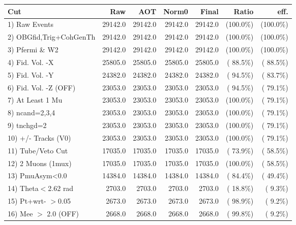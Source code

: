  \begin{table}[h!]\centering
 \begin{tabular}{||l||r|r|r|r|r|r||}
 \hline
 \hline
 Cut & Raw & AOT & Norm0 & Final & Ratio & eff.       \\
 \hline
  1) Raw Events           &      29142.0 &      29142.0 &      29142.0 &      29142.0 & (100.0\%) & (100.0\%) \\
  2) OBGfid,Trig+CohGenTh &      29142.0 &      29142.0 &      29142.0 &      29142.0 & (100.0\%) & (100.0\%) \\
  3) Pfermi \& W2         &      29142.0 &      29142.0 &      29142.0 &      29142.0 & (100.0\%) & (100.0\%) \\
  4) Fid. Vol. -X         &      25805.0 &      25805.0 &      25805.0 &      25805.0 & ( 88.5\%) & ( 88.5\%) \\
  5) Fid. Vol. -Y         &      24382.0 &      24382.0 &      24382.0 &      24382.0 & ( 94.5\%) & ( 83.7\%) \\
  6) Fid. Vol. -Z (OFF)   &      23053.0 &      23053.0 &      23053.0 &      23053.0 & ( 94.5\%) & ( 79.1\%) \\
  7) At Least 1 Mu        &      23053.0 &      23053.0 &      23053.0 &      23053.0 & (100.0\%) & ( 79.1\%) \\
  8) ncand=2,3,4          &      23053.0 &      23053.0 &      23053.0 &      23053.0 & (100.0\%) & ( 79.1\%) \\
  9) tnchgd=2             &      23053.0 &      23053.0 &      23053.0 &      23053.0 & (100.0\%) & ( 79.1\%) \\
 10) +/- Tracks (V0)      &      23053.0 &      23053.0 &      23053.0 &      23053.0 & (100.0\%) & ( 79.1\%) \\
 11) Tube/Veto Cut        &      17035.0 &      17035.0 &      17035.0 &      17035.0 & ( 73.9\%) & ( 58.5\%) \\
 12) 2 Muons (1mux)       &      17035.0 &      17035.0 &      17035.0 &      17035.0 & (100.0\%) & ( 58.5\%) \\
 13) PmuAsym<0.0          &      14384.0 &      14384.0 &      14384.0 &      14384.0 & ( 84.4\%) & ( 49.4\%) \\
 14) Theta$<$2.62 rad     &       2703.0 &       2703.0 &       2703.0 &       2703.0 & ( 18.8\%) & (  9.3\%) \\
 15) Pt+wrt- $>$0.05      &       2673.0 &       2673.0 &       2673.0 &       2673.0 & ( 98.9\%) & (  9.2\%) \\
 16) Mee $>$ 2.0  (OFF)   &       2668.0 &       2668.0 &       2668.0 &       2668.0 & ( 99.8\%) & (  9.2\%) \\

\end{tabular}
\end{table}
